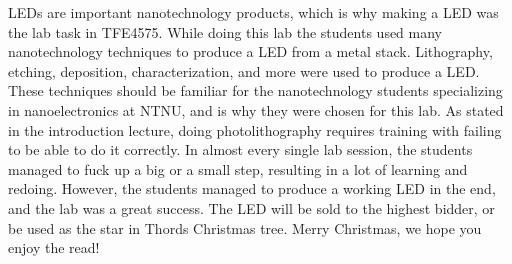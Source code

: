 
LEDs are important nanotechnology products, which is why making a LED was the lab task in TFE4575.
While doing this lab the students used many nanotechnology techniques to produce a LED from a metal stack.
Lithography, etching, deposition, characterization, and more were used to produce a LED.
These techniques should be familiar for the nanotechnology students specializing in nanoelectronics at NTNU, and is why they were chosen for this lab.
As stated in the introduction lecture, doing photolithography requires training with failing to be able to do it correctly.
In almost every single lab session, the students managed to fuck up a big or a small step, resulting in a lot of learning and redoing.
However, the students managed to produce a working LED in the end, and the lab was a great success.
The LED will be sold to the highest bidder, or be used as the star in Thords Christmas tree.
Merry Christmas, we hope you enjoy the read!
